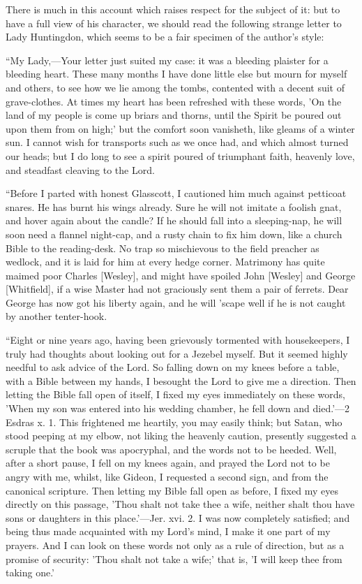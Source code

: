There is much in this account which raises
respect for the subject of it: but to have a full view of his
character, we should read the following strange letter to Lady
Huntingdon, which seems to be a fair specimen of the author's style:

``My
Lady,—Your letter just suited my case: it was a bleeding plaister
for a bleeding heart. These many months I have done little else but
mourn for myself and others, to see how we lie among the tombs,
contented with a decent suit of grave-clothes. At times my heart has
been refreshed with these words, 'On the land of my people is come up
briars and thorns, until the Spirit be poured out upon them from on
high;' but the comfort soon vanisheth, like gleams of a winter sun. I
cannot wish for transports such as we once had, and which almost
turned our heads; but I do long to see a spirit poured of triumphant
faith, heavenly love, and steadfast cleaving to the Lord.

``Before
I parted with honest Glasscott, I cautioned him much against petticoat
snares. He has burnt his wings already. Sure he will not imitate a
foolish gnat, and hover again about the candle? If he should fall into
a sleeping-nap, he will soon need a flannel night-cap, and a rusty
chain to fix him down, like a church Bible to the reading-desk. No
trap so mischievous to the field preacher as wedlock, and it is laid
for him at every hedge corner. Matrimony has quite maimed poor Charles
[Wesley], and might have spoiled John
[Wesley] and George [Whitfield], if a wise Master had not graciously
sent them a pair of ferrets. Dear George has now got his liberty
again, and he will 'scape well if he is not caught by another tenter-hook.

``Eight
or nine years ago, having been grievously tormented with housekeepers,
I truly had thoughts about looking out for a Jezebel myself. But it
seemed highly needful to ask advice of the Lord. So falling down on my
knees before a table, with a Bible between my hands, I besought the
Lord to give me a direction. Then letting the Bible fall open of
itself, I fixed my eyes immediately on these words, 'When my son was
entered into his wedding chamber, he fell down and died.'—2 Esdras
x. 1. This frightened me heartily, you may easily think; but Satan,
who stood peeping at my elbow, not liking the heavenly caution,
presently suggested a scruple that the book was apocryphal, and the
words not to be heeded. Well, after a short pause, I fell on my knees
again, and prayed the Lord not to be angry with me, whilst, like
Gideon, I requested a second sign, and from the canonical scripture.
Then letting my Bible fall open as before, I fixed my eyes directly on
this passage, 'Thou shalt not take thee a wife, neither shalt thou
have sons or daughters in this place.'—Jer. xvi. 2. I was now
completely satisfied; and being thus made acquainted with my Lord's
mind, I make it one part of my prayers. And I can look on these words
not only as a rule of direction, but as a promise of security: 'Thou
shalt not take a wife;' that is, 'I will keep thee from taking one.'

